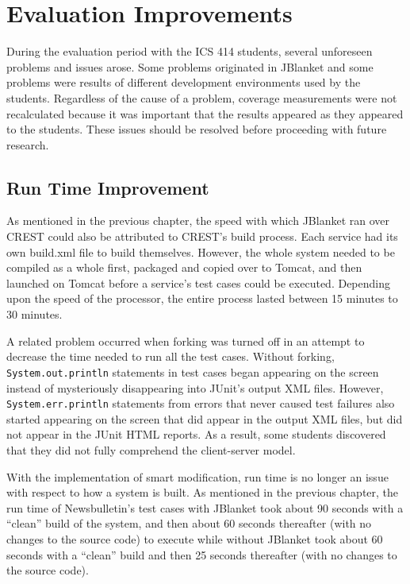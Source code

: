 \section{Evaluation Improvements}
During the evaluation period with the ICS 414 students, several unforeseen
problems and issues arose.  Some problems originated in JBlanket and some
problems were results of different development environments used by the
students.  Regardless of the cause of a problem, coverage measurements were
not recalculated because it was important that the results appeared as they
appeared to the students.  These issues should be resolved before
proceeding with future research.

\subsection{Run Time Improvement}
As mentioned in the previous chapter, the speed with which JBlanket ran
over CREST could also be attributed to CREST's build process.  Each service
had its own build.xml file to build themselves.  However, the whole system
needed to be compiled as a whole first, packaged and copied over to Tomcat,
and then launched on Tomcat before a service's test cases could be
executed.  Depending upon the speed of the processor, the entire process
lasted between 15 minutes to 30 minutes.

A related problem occurred when forking was turned off in an attempt to
decrease the time needed to run all the test cases.  Without forking, {\tt
System.out.println} statements in test cases began appearing on the screen
instead of mysteriously disappearing into JUnit's output XML files.
However, {\tt System.err.println} statements from errors that never caused
test failures also started appearing on the screen that did appear in the
output XML files, but did not appear in the JUnit HTML reports.  As a
result, some students discovered that they did not fully comprehend the
client-server model.

With the implementation of smart modification, run time is no longer an
issue with respect to how a system is built.  As mentioned in the previous
chapter, the run time of Newsbulletin's test cases with JBlanket took about
90 seconds with a ``clean'' build of the system, and then about 60 seconds
thereafter (with no changes to the source code) to execute while without
JBlanket took about 60 seconds with a ``clean'' build and then 25 seconds
thereafter (with no changes to the source code).


